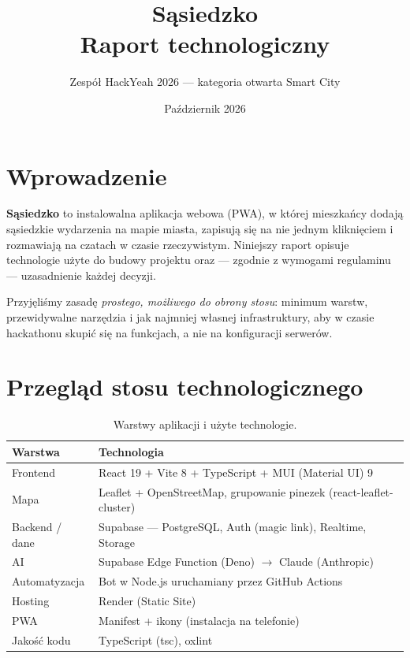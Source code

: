 \documentclass[11pt,a4paper]{article}
\title{\textbf{Sąsiedzko} \\[0.3em] \large Raport technologiczny}
\author{Zespół HackYeah 2026 --- kategoria otwarta Smart City}
\date{Październik 2026}
\begin{document}
\maketitle

\section{Wprowadzenie}

\textbf{Sąsiedzko} to instalowalna aplikacja webowa (PWA), w której mieszkańcy dodają
sąsiedzkie wydarzenia na mapie miasta, zapisują się na nie jednym kliknięciem i rozmawiają
na czatach w czasie rzeczywistym. Niniejszy raport opisuje technologie użyte do budowy
projektu oraz --- zgodnie z wymogami regulaminu --- uzasadnienie każdej decyzji.

Przyjęliśmy zasadę \emph{prostego, możliwego do obrony stosu}: minimum warstw, przewidywalne
narzędzia i jak najmniej własnej infrastruktury, aby w czasie hackathonu skupić się na funkcjach,
a nie na konfiguracji serwerów.

\section{Przegląd stosu technologicznego}

\begin{table}[h]
\centering
\renewcommand{\arraystretch}{1.3}
\begin{tabularx}{\textwidth}{@{}l X@{}}
\toprule
\textbf{Warstwa} & \textbf{Technologia} \\
\midrule
Frontend        & React 19 + Vite 8 + TypeScript + MUI (Material UI) 9 \\
Mapa            & Leaflet + OpenStreetMap, grupowanie pinezek (react-leaflet-cluster) \\
Backend / dane  & Supabase --- PostgreSQL, Auth (magic link), Realtime, Storage \\
AI              & Supabase Edge Function (Deno) $\rightarrow$ Claude (Anthropic) \\
Automatyzacja   & Bot w Node.js uruchamiany przez GitHub Actions \\
Hosting         & Render (Static Site) \\
PWA             & Manifest + ikony (instalacja na telefonie) \\
Jakość kodu     & TypeScript (tsc), oxlint \\
\bottomrule
\end{tabularx}
\caption{Warstwy aplikacji i użyte technologie.}
\end{table}
\end{document}
